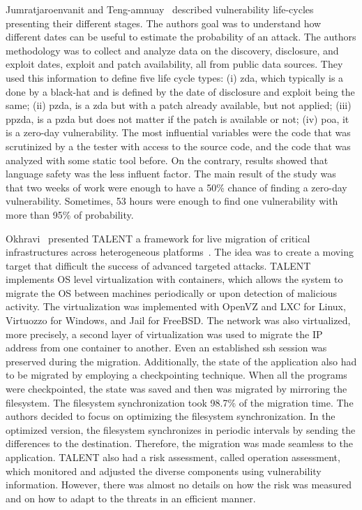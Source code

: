 Jumratjaroenvanit and Teng-amnuay~\cite{Jumratjaroenvanit:2008} described vulnerability life-cycles presenting their different stages. 
The authors goal was to understand how different dates can be useful to estimate the probability of an attack. 
The authors methodology was to collect and analyze data on the discovery, disclosure, and exploit dates, exploit and patch availability, all from public data sources. 
They used this information to define five life cycle types: (i) \gls{zda}, which typically is a done by a black-hat and is defined by the date of disclosure and exploit being the same; (ii) \gls{pzda}, is a \gls{zda} but with a patch already available, but not applied; 
(iii) \gls{ppzda}, is a \gls{pzda} but does not matter if the patch is available or not; 
(iv) \gls{poa}, it is a zero-day vulnerability. 
The most influential variables were the code that was scrutinized by a the tester with access to the source code, and the code that was analyzed with some static tool before. 
On the contrary, results showed that language safety was the less influent factor. 
The main result of the study was that two weeks of work were enough to have a 50\% chance of finding a zero-day vulnerability. 
Sometimes, 53 hours were enough to find one vulnerability with more than 95\% of probability.


Okhravi~\etal{} presented TALENT a framework for live migration of critical infrastructures across heterogeneous platforms~\cite{Okhravi:2014,Okhravi:2009}. 
The idea was to create a moving target that difficult the success of advanced targeted attacks. 
TALENT implements OS level virtualization with containers, which allows the system to migrate the OS between machines periodically or upon detection of malicious activity. 
The virtualization was implemented with OpenVZ and LXC for Linux, Virtuozzo for Windows, and Jail for FreeBSD. 
The network was also virtualized, more precisely, a second layer of virtualization was used to migrate the IP address from one container to another. 
Even an established ssh session was preserved during the migration. 
Additionally, the state of the application also had to be migrated by employing a checkpointing technique. 
When all the programs were checkpointed, the state was saved and then was migrated by mirroring the filesystem. 
The filesystem synchronization took 98.7\% of the migration time. 
The authors decided to focus on optimizing the filesystem synchronization. 
In the optimized version, the filesystem synchronizes in periodic intervals by sending the differences to the destination. 
Therefore, the migration was made seamless to the application. 
TALENT also had a risk assessment, called operation assessment, which monitored and adjusted the diverse components using vulnerability information. 
However, there was almost no details on how the risk was measured and on how to adapt to the threats in an efficient manner.

